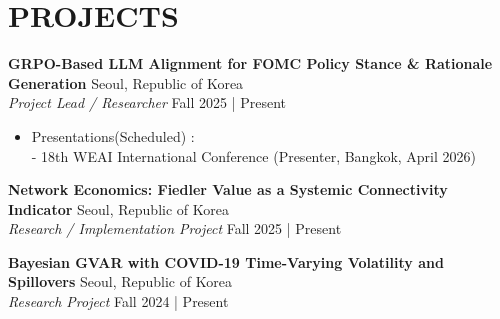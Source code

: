\documentclass[a4paper,9pt]{extarticle}
\begin{document}
\section*{PROJECTS}

\noindent
\textbf{GRPO-Based LLM Alignment for FOMC Policy Stance \& Rationale Generation} \hfill Seoul, Republic of Korea\\
\textit{Project Lead / Researcher} \hfill Fall 2025 | Present
\begin{itemize}
    \item Presentations(Scheduled) :\\
        - 18th WEAI International Conference (Presenter, Bangkok, April 2026)
    \end{itemize}

\noindent
\textbf{Network Economics: Fiedler Value as a Systemic Connectivity Indicator} \hfill Seoul, Republic of Korea\\
\textit{Research / Implementation Project} \hfill Fall 2025 | Present

\noindent
\textbf{Bayesian GVAR with COVID-19 Time-Varying Volatility and Spillovers} \hfill Seoul, Republic of Korea\\
\textit{Research Project} \hfill Fall 2024 | Present
\end{document}
